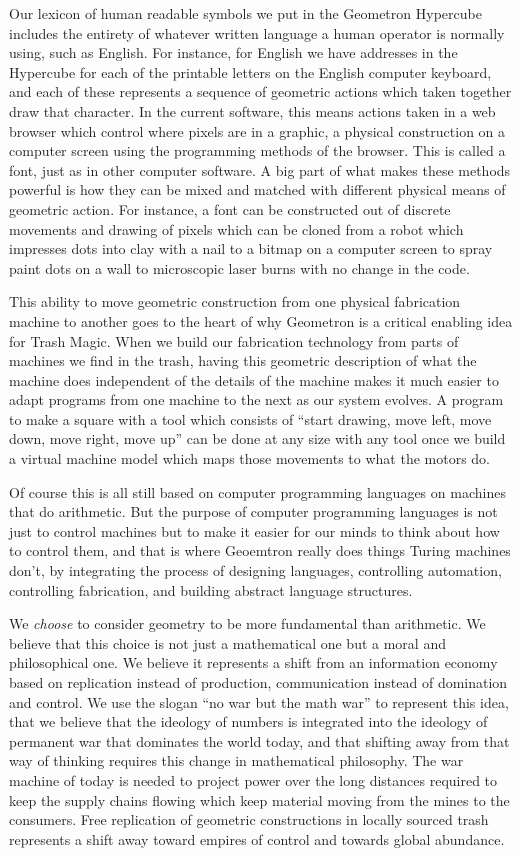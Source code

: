 Our lexicon of human readable symbols we put in the Geometron Hypercube
includes the entirety of whatever written language a human operator is
normally using, such as English. For instance, for English we have
addresses in the Hypercube for each of the printable letters on the
English computer keyboard, and each of these represents a sequence of
geometric actions which taken together draw that character. In the
current software, this means actions taken in a web browser which
control where pixels are in a graphic, a physical construction on a
computer screen using the programming methods of the browser. This is
called a font, just as in other computer software. A big part of what
makes these methods powerful is how they can be mixed and matched with
different physical means of geometric action. For instance, a font can
be constructed out of discrete movements and drawing of pixels which can
be cloned from a robot which impresses dots into clay with a nail to a
bitmap on a computer screen to spray paint dots on a wall to microscopic
laser burns with no change in the code.

This ability to move geometric construction from one physical
fabrication machine to another goes to the heart of why Geometron is a
critical enabling idea for Trash Magic. When we build our fabrication
technology from parts of machines we find in the trash, having this
geometric description of what the machine does independent of the
details of the machine makes it much easier to adapt programs from one
machine to the next as our system evolves. A program to make a square
with a tool which consists of ``start drawing, move left, move down,
move right, move up'' can be done at any size with any tool once we
build a virtual machine model which maps those movements to what the
motors do.

Of course this is all still based on computer programming languages on
machines that do arithmetic. But the purpose of computer programming
languages is not just to control machines but to make it easier for our
minds to think about how to control them, and that is where Geoemtron
really does things Turing machines don't, by integrating the process of
designing languages, controlling automation, controlling fabrication,
and building abstract language structures.

We \emph{choose} to consider geometry to be more fundamental than
arithmetic. We believe that this choice is not just a mathematical one
but a moral and philosophical one. We believe it represents a shift from
an information economy based on replication instead of production,
communication instead of domination and control. We use the slogan ``no
war but the math war'' to represent this idea, that we believe that the
ideology of numbers is integrated into the ideology of permanent war
that dominates the world today, and that shifting away from that way of
thinking requires this change in mathematical philosophy. The war
machine of today is needed to project power over the long distances
required to keep the supply chains flowing which keep material moving
from the mines to the consumers. Free replication of geometric
constructions in locally sourced trash represents a shift away toward
empires of control and towards global abundance.
